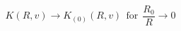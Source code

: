 \begin{equation}
\label{kcond}
K(R,v) \rightarrow K_{(0)}(R,v) \ \ \mbox{for} \ \
\frac{R_0}{R} \rightarrow 0
\end{equation}

